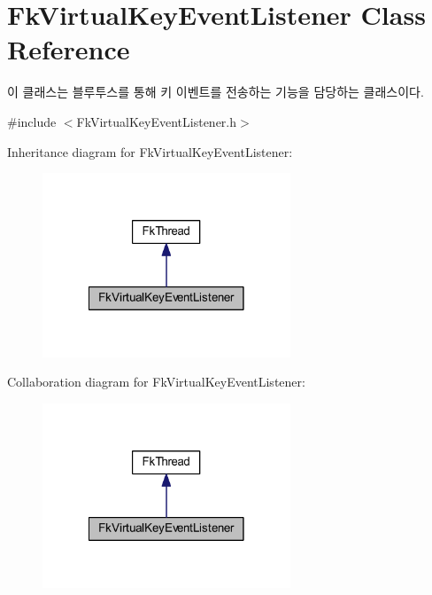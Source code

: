 \hypertarget{class_fk_virtual_key_event_listener}{}\section{Fk\+Virtual\+Key\+Event\+Listener Class Reference}
\label{class_fk_virtual_key_event_listener}


이 클래스는 블루투스를 통해 키 이벤트를 전송하는 기능을 담당하는 클래스이다.  




{\ttfamily \#include $<$Fk\+Virtual\+Key\+Event\+Listener.\+h$>$}



Inheritance diagram for Fk\+Virtual\+Key\+Event\+Listener\+:\nopagebreak
\begin{figure}[H]
\begin{center}
\leavevmode
\includegraphics[width=210pt]{class_fk_virtual_key_event_listener__inherit__graph}
\end{center}
\end{figure}


Collaboration diagram for Fk\+Virtual\+Key\+Event\+Listener\+:\nopagebreak
\begin{figure}[H]
\begin{center}
\leavevmode
\includegraphics[width=210pt]{class_fk_virtual_key_event_listener__coll__graph}
\end{center}
\end{figure}

